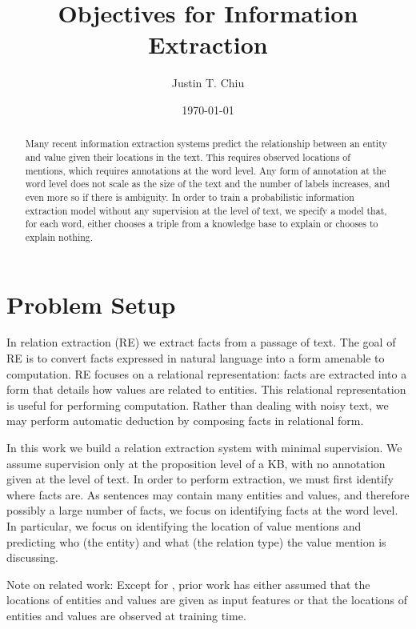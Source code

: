 \documentclass[12pt]{article}
\title{Objectives for Information Extraction}
\author{
Justin T. Chiu
}
\date{\today}
\begin{document}
\maketitle

\begin{abstract}
Many recent information extraction systems predict the relationship between an entity and value given
their locations in the text.
This requires observed locations of mentions, which requires annotations at the word level.
Any form of annotation at the word level does not scale as the size of the text
and the number of labels increases, and even more so if there is ambiguity.
In order to train a probabilistic information extraction model without any
supervision at the level of text, we specify a model 
that, for each word, either chooses a triple from a knowledge base to explain
or chooses to explain nothing.
\end{abstract}

\section{Problem Setup}

In relation extraction (RE) we extract facts from a passage of text.
The goal of RE is to convert facts expressed in natural language into a form
amenable to computation.
RE focuses on a relational representation: facts are extracted into a form that details
how values are related to entities.
This relational representation is useful for performing computation.
Rather than dealing with noisy text, we may perform automatic deduction by composing facts 
in relational form.

In this work we build a relation extraction system with minimal supervision.
We assume supervision only at the proposition level of a KB,
with no annotation given at the level of text.
In order to perform extraction, we must first identify where facts are.
As sentences may contain many entities and values, and therefore possibly
a large number of facts, we focus on identifying facts at the word level.
In particular, we focus on identifying the location of value mentions
and predicting who (the entity) and what (the relation type) the value mention
is discussing.

Note on related work:
Except for \citet{zeng2018copy}, prior work has either assumed that the locations of
entities and values are given as input features or that the locations of entities and values
are observed at training time.
\end{document}
